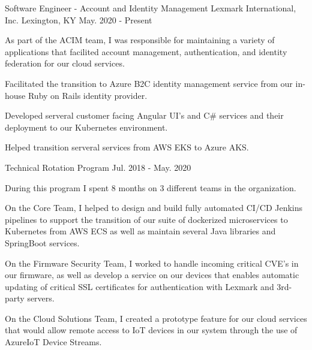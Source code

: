 

\begin{cventries}

  \cventry
    {Software Engineer - Account and Identity Management} %
    {Lexmark International, Inc.} %
    {Lexington, KY} %
    {May. 2020 - Present} %
    {
      \begin{cvitems} %
        \item {As part of the ACIM team, I was responsible for maintaining a variety of applications that facilited account management, authentication, and identity federation for our cloud services.}
        \item {Facilitated the transition to Azure B2C identity management service from our in-house Ruby on Rails identity provider.}
        \item {Developed serveral customer facing Angular UI's and C\# services and their deployment to our Kubernetes environment.}
        \item {Helped transition serveral services from AWS EKS to Azure AKS.}
      \end{cvitems}
    }

  \cventry
    {Technical Rotation Program} %
    { } %
    { } %
    {Jul. 2018 - May. 2020} %
    {
      \begin{cvitems} %
        \item {During this program I spent 8 months on 3 different teams in the organization.}
        \item {On the Core Team, I helped to design and build fully automated CI/CD Jenkins pipelines to support the transition of our suite of dockerized microservices to Kubernetes from AWS ECS as well as maintain several Java libraries and SpringBoot services.}
        \item {On the Firmware Security Team, I worked to handle incoming critical CVE's in our firmware, as well as develop a service on our devices that enables automatic updating of critical SSL certificates for authentication with Lexmark and 3rd-party servers.}
        \item {On the Cloud Solutions Team, I created a prototype feature for our cloud services that would allow remote access to IoT devices in our system through the use of AzureIoT Device Streams.}
      \end{cvitems}
    }


\end{cventries}
